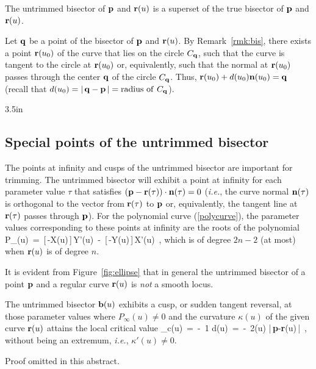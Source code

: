 \begin{propn}
\label{p:superset}
The untrimmed bisector of ${\bf p}$ and ${\bf r}(u)$ is a superset
of the true bisector of ${\bf p}$ and ${\bf r}(u)$.
\end{propn}
\ifFull
\prf
Let ${\bf q}$ be a point of the bisector of ${\bf p}$ and ${\bf r}(u)$.
By Remark~\ref{rmk:bis}, there exists a point ${\bf r}(u_{0})$ of the
curve that lies on the circle $C_{\bf q}$, such that the curve is tangent
to the circle at ${\bf r}(u_{0})$ or, equivalently, such that the normal
at ${\bf r}(u_{0})$ passes through the center ${\bf q}$ of the circle
$C_{\bf q}$. Thus, ${\bf r}(u_{0}) + d(u_{0}){\bf n}(u_{0}) = {\bf q}$
(recall that $d(u_0)=|\,{\bf q}-{\bf p}\,|={\rm radius\ of\ } C_{\bf q}$).
\QED
\fi

{3.5in}

\subsection{Special points of the untrimmed bisector}
\label{sec:irregpts}

The points at infinity and cusps of the untrimmed 
bisector are important for trimming.
The untrimmed bisector will exhibit a point at infinity
for each parameter value $\tau$ that satisfies $({\bf p}-{\bf r}(\tau))
\cdot{\bf n}(\tau)=0$ ({\it i.e.}, the curve normal ${\bf n}(\tau)$
is orthogonal to the vector from ${\bf r}(\tau)$ to ${\bf p}$ or,
equivalently, the tangent line at ${\bf r}(\tau)$ passes through
${\bf p}$). For the polynomial curve (\ref{polycurve}),
the parameter values corresponding to these points
at infinity are the roots of the polynomial
\be \label{Pinf}
P_\infty(u) \,=\,
[\,\alpha-X(u)\,]\,Y'(u) \,-\, [\,\beta-Y(u)\,]\,X'(u) \,,
\ee
which is of degree $2n-2$ (at most) when ${\bf r}(u)$ is of degree $n$.

It is evident from Figure~\ref{fig:ellipse}
that in general the untrimmed bisector of a point ${\bf p}$ and a
regular curve ${\bf r}(u)$ is {\it not\/} a smooth locus.

\begin{lma}
The untrimmed bisector ${\bf b}(u)$ exhibits a cusp, or sudden
tangent reversal, at those parameter values where $P_\infty(u)
\not=0$ and the curvature $\kappa(u)$ of the given curve ${\bf r}
(u)$ attains the local critical value
\be \label{kappacrit}
\kappa_c(u) \,=\, -\ {1 \over d(u)} \,=\,
-\ {2\cos\psi(u) \over |\,{\bf p}-{\bf r}(u)\,|} \,,
\ee
without being an extremum, {\it i.e.}, $\kappa'(u)\not=0$.
\end{lma}
\ifFull
\prf Proof omitted in this abstract. \QED
\fi

